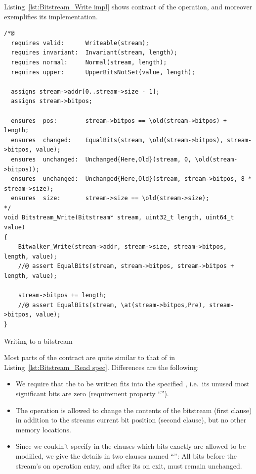 \clearpage

Listing~\ref{lst:Bitstream_Write impl} shows contract of
the  operation,
and moreover exemplifies its implementation.


\begin{listing}[hbt]
\begin{minipage}{0.99\textwidth}
\begin{lstlisting}[style=acsl-block]
/*@
  requires valid:      Writeable(stream);
  requires invariant:  Invariant(stream, length);
  requires normal:     Normal(stream, length);
  requires upper:      UpperBitsNotSet(value, length);

  assigns stream->addr[0..stream->size - 1];
  assigns stream->bitpos;

  ensures  pos:        stream->bitpos == \old(stream->bitpos) + length;
  ensures  changed:    EqualBits(stream, \old(stream->bitpos), stream->bitpos, value);
  ensures  unchanged:  Unchanged{Here,Old}(stream, 0, \old(stream->bitpos));
  ensures  unchanged:  Unchanged{Here,Old}(stream, stream->bitpos, 8 * stream->size);
  ensures  size:       stream->size == \old(stream->size);
*/
void Bitstream_Write(Bitstream* stream, uint32_t length, uint64_t value)
{
    Bitwalker_Write(stream->addr, stream->size, stream->bitpos, length, value);
    //@ assert EqualBits(stream, stream->bitpos, stream->bitpos + length, value);

    stream->bitpos += length;
    //@ assert EqualBits(stream, \at(stream->bitpos,Pre), stream->bitpos, value);
}

\end{lstlisting}
\end{minipage}
\caption{\label{lst:Bitstream_Write impl}Writing to a bitstream}
\end{listing}

\FloatBarrier

Most parts of the contract are quite similar to that of
 in
Listing~\ref{lst:Bitstream_Read spec}.
%
Differences are the following:
\begin{itemize}
\item We require that the  to be written fits into
	the specified
	, i.e.\ its unused most significant bits
	are zero (requirement property
	``'').
\item The operation is allowed to change the contents of the bitstream
	(first  clause) in addition to the streams
	current bit
	position (second  clause), but no other
	memory locations.
\item Since we couldn't specify in the  clauses 
	which bits exactly are allowed to be modified, we give the
	details in two
	 clauses named ``'':
	All bits before the stream's  on operation
	entry, and after
	its  on exit, must remain unchanged.
\end{itemize}



